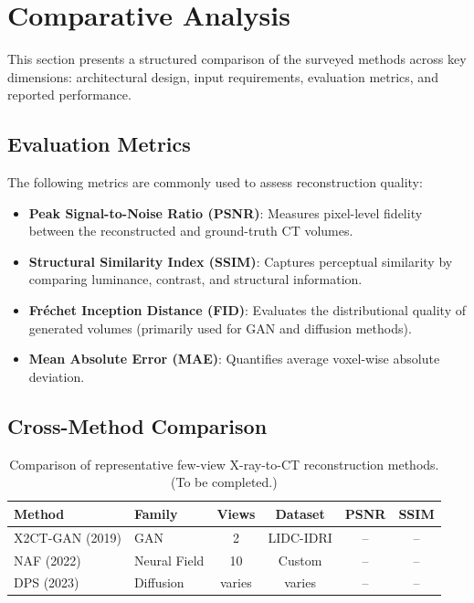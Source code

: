 
\section{Comparative Analysis}
\label{sec:comparative_analysis}

This section presents a structured comparison of the surveyed methods across key dimensions: architectural design, input requirements, evaluation metrics, and reported performance.

\subsection{Evaluation Metrics}

The following metrics are commonly used to assess reconstruction quality:

\begin{itemize}
  \item \textbf{Peak Signal-to-Noise Ratio (PSNR)}: Measures pixel-level fidelity between the reconstructed and ground-truth CT volumes.
  \item \textbf{Structural Similarity Index (SSIM)}: Captures perceptual similarity by comparing luminance, contrast, and structural information.
  \item \textbf{Fréchet Inception Distance (FID)}: Evaluates the distributional quality of generated volumes (primarily used for GAN and diffusion methods).
  \item \textbf{Mean Absolute Error (MAE)}: Quantifies average voxel-wise absolute deviation.
\end{itemize}

\subsection{Cross-Method Comparison}


\begin{table}[h]
  \centering
  \caption{Comparison of representative few-view X-ray-to-CT reconstruction methods. (To be completed.)}
  \label{tab:comparison}
  \begin{tabular}{llcccc}
    \toprule
    \textbf{Method} & \textbf{Family} & \textbf{Views} & \textbf{Dataset} & \textbf{PSNR} & \textbf{SSIM} \\
    \midrule
    X2CT-GAN (2019)  & GAN        & 2 & LIDC-IDRI & --    & --   \\
    NAF (2022)       & Neural Field & 10 & Custom   & --    & --   \\
    DPS (2023)       & Diffusion  & varies & varies & --    & --   \\
    \bottomrule
  \end{tabular}
\end{table}

